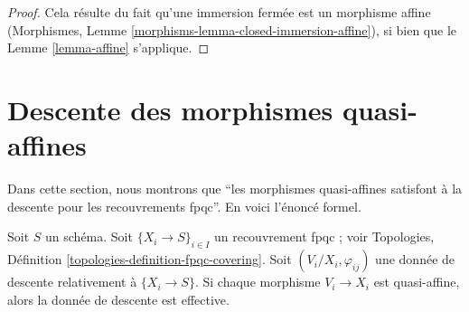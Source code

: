 \begin{proof}
Cela résulte du fait qu'une immersion fermée est un morphisme affine
(Morphismes, Lemme \ref{morphisms-lemma-closed-immersion-affine}), si bien que
le Lemme \ref{lemma-affine} s'applique.
\end{proof}


\section{Descente des morphismes quasi-affines}
\label{section-quasi-affine}

\noindent
Dans cette section, nous montrons que
``les morphismes quasi-affines satisfont à la descente pour les recouvrements
fpqc''. En voici l'énoncé formel.

\begin{lemma}
\label{lemma-quasi-affine}
Soit $S$ un schéma. Soit $\{X_i \to S\}_{i\in I}$ un recouvrement fpqc ; voir
Topologies, Définition \ref{topologies-definition-fpqc-covering}. Soit
$(V_i/X_i, \varphi_{ij})$ une donnée de descente relativement à
$\{X_i \to S\}$. Si chaque morphisme $V_i \to X_i$ est quasi-affine, alors la
donnée de descente est effective.
\end{lemma}

